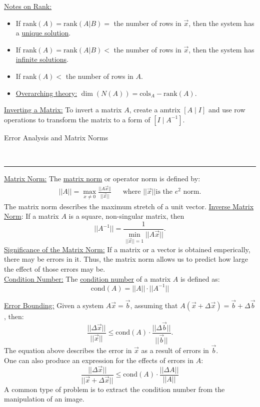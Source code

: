 \documentclass{article}
\newcommand{\header}[1]{\begin{large}\noindent #1\end{large}\\\rule{\textwidth}{0.5pt}}
\newcommand{\gap}{\medskip\\}
\begin{document}
    \underline{Notes on Rank:}
    \begin{itemize}
        \item If $\textrm{rank}(A) = \textrm{rank}(A|B) =$ the number of rows in $\vec{x}$, then
        the system has a \underline{unique solution}.
        \item If $\textrm{rank}(A) = \textrm{rank}(A|B) <$ the number of rows in $\vec{x}$, then the system has \underline{infinite solutions}.
        \item If $\textrm{rank}(A) <$ the number of rows in $A$.
        \item \underline{Overarching theory:} $\dim(N(A)) = \textrm{cols}_A - \textrm{rank}(A)$.
    \end{itemize}

    \underline{Inverting a Matrix:} To invert a matrix $A$, create a amtrix $[A \mid I]$ and
    use row operations to transform the matrix to a form of $[I \mid A^{-1}]$.
\gap
\header{Error Analysis and Matrix Norms}

\underline{Matrix Norm:} The \underline{matrix norm} or operator norm is defined by:
\begin{align*}
    ||A|| = \max_{x \neq 0} \frac{||A\vec{x}||}{||\vec{x}||} && \textrm{where } ||\vec{x}|| \textrm{is the } e^2 \textrm{ norm}.
\end{align*}
The matrix norm describes the maximum stretch of a unit vector.
\underline{Inverse Matrix Norm}: If a matrix $A$ is a square, non-singular matrix, then
\[
    ||A^{-1}|| = \frac{1}{\min_{||\vec{x}|| = 1}||A\vec{x}||}.
\]
\underline{Significance of the Matrix Norm:} If a matrix or a vector is obtained
emperically, there may be errors in it. Thus, the matrix norm allows us to predict
how large the effect of those errors may be.
\gap
\underline{Condition Number:} The \underline{condition number} of a matrix $A$ is 
defined as:
\[
    \textrm{cond}(A) = ||A||\cdot||A^{-1}||
\]

\underline{Error Bounding:} Given a system $A\vec{x} = \vec{b}$, assuming that
$A(\vec{x} + \Delta\vec{x}) = \vec{b} + \Delta \vec{b}$, then:
\[
    \frac{||\Delta\vec{x}||}{||\vec{x}||} \leq \textrm{cond}(A) \cdot \frac{||\Delta \vec{b}||}{||\vec{b}||}.
\]
The equation above describes the error in $\vec{x}$ as a result of errors in $\vec{b}$.
\gap
One can also produce an expression for the effects of errors in $A$:
\[
    \frac{||\Delta \vec{x}||}{||\vec{x} + \Delta \vec{x}||} \leq \textrm{cond}(A) \cdot \frac{||\Delta A||}{||A||}  
\]
A common type of problem is to extract the condition number from the manipulation of
an image.
\end{document}
